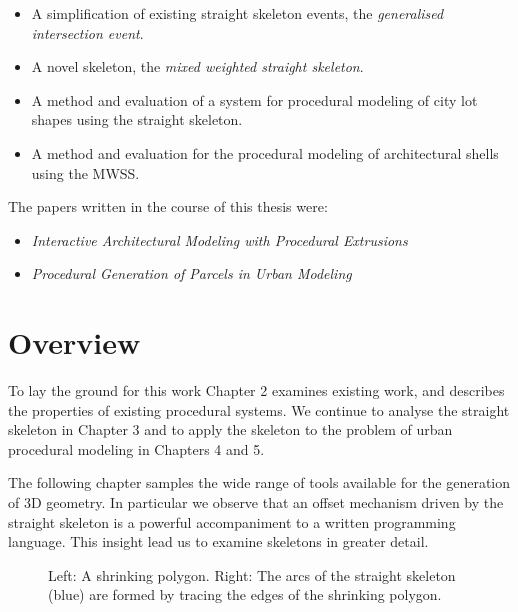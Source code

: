 \begin{itemize}
\item{A simplification of existing straight skeleton events, the \emph{generalised intersection event}.}
\item{A novel skeleton, the \emph{mixed weighted straight skeleton}.}
\item{A method and evaluation of a system for procedural modeling of city lot shapes using the straight skeleton.}
\item{A method and evaluation for the procedural modeling of architectural shells using the MWSS.}
\end{itemize}

The papers written in the course of this thesis were:
\begin{itemize}

\item{\emph{Interactive Architectural Modeling with Procedural Extrusions}\cite{twak11}}
\item{\emph{Procedural Generation of Parcels in Urban Modeling}\cite{twak12}}

\end{itemize}




\section{Overview}

To lay the ground for this work Chapter 2 examines existing work, and describes the properties of existing procedural systems. We continue to analyse the straight skeleton in Chapter 3 and to apply the skeleton to the problem of urban procedural modeling in Chapters 4 and 5. 

The following chapter samples the wide range of tools available for the generation of 3D geometry. In particular we observe that an offset mechanism driven by the straight skeleton is a powerful accompaniment to a written programming language. This insight lead us to examine skeletons in greater detail.

\begin{figure}
  \centering
  \def\svgwidth{0.7\columnwidth}
  
  \caption[Shrinking a polygon to form the straight skeleton]{\label{fig:skel_shrinkINTRO}Left: A shrinking polygon. Right: The arcs of the straight skeleton (blue) are formed by tracing the edges of the shrinking polygon.}
\end{figure}

